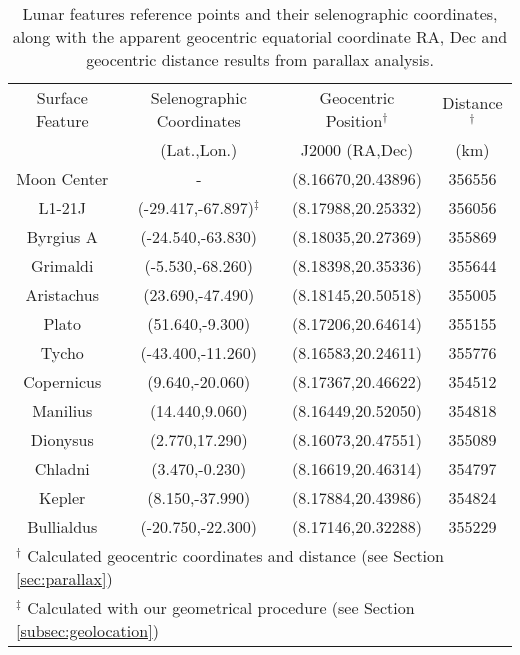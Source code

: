 
\begin{table*}
\centering
\begin{tabular}{cccc}
\hline\hline
Surface Feature & Selenographic Coordinates & Geocentric Position$^\dagger$ & Distance$^\dagger$ \\
                & (Lat.,Lon.)               & J2000 (RA,Dec)      & (km)     \\\hline
Moon Center & - & (8.16670,20.43896) & 356556\\
L1-21J & (-29.417,-67.897)$^\ddagger$ & (8.17988,20.25332) & 356056\\
Byrgius A & (-24.540,-63.830) & (8.18035,20.27369) & 355869\\
Grimaldi & (-5.530,-68.260) & (8.18398,20.35336) & 355644\\
Aristachus & (23.690,-47.490) & (8.18145,20.50518) & 355005\\
Plato & (51.640,-9.300) & (8.17206,20.64614) & 355155\\
Tycho & (-43.400,-11.260) & (8.16583,20.24611) & 355776\\
Copernicus & (9.640,-20.060) & (8.17367,20.46622) & 354512\\
Manilius & (14.440,9.060) & (8.16449,20.52050) & 354818\\
Dionysus & (2.770,17.290) & (8.16073,20.47551) & 355089\\
Chladni & (3.470,-0.230) & (8.16619,20.46314) & 354797\\
Kepler & (8.150,-37.990) & (8.17884,20.43986) & 354824\\
Bullialdus & (-20.750,-22.300) & (8.17146,20.32288) & 355229\\

\hline\hline
\multicolumn{4}{l}{\footnotesize $^\dagger$ Calculated geocentric coordinates and distance (see Section \ref{sec:parallax})}\\
\multicolumn{4}{l}{\footnotesize $^\ddagger$ Calculated with our geometrical procedure (see Section \ref{subsec:geolocation})}\\
\end{tabular}
\caption{Lunar features reference points and their selenographic coordinates, along with the apparent geocentric equatorial coordinate RA, Dec and geocentric distance results from parallax analysis.}
\label{tab:surfacefeatures}
\end{table*}
